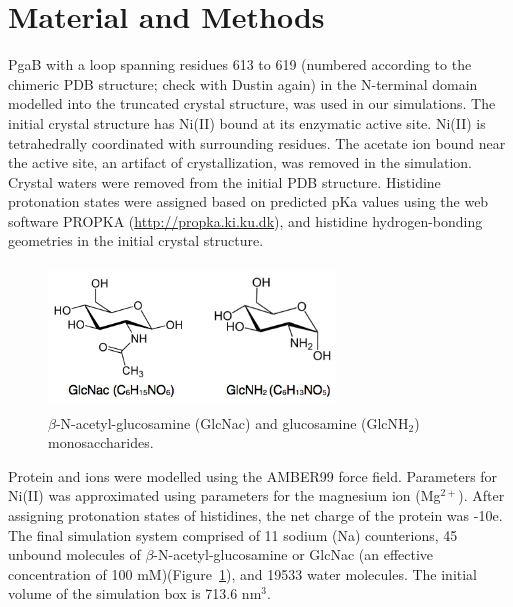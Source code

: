 
\section{Material and Methods}
PgaB with a loop spanning residues 613 to 619 (numbered according to the chimeric PDB structure; check with Dustin again) in the N-terminal domain modelled into the truncated crystal structure, was used in our simulations. The initial crystal structure has Ni(II) bound at its enzymatic active site. Ni(II) is tetrahedrally coordinated with surrounding residues.  The acetate ion bound near the active site, an artifact of crystallization, was removed in the simulation. Crystal waters were removed from the initial PDB structure. Histidine protonation states were assigned based on predicted pKa values using the web software PROPKA (\url{http://propka.ki.ku.dk}), and histidine hydrogen-bonding geometries in the initial crystal structure.

\begin{figure}[nag]
  \centering
  \includegraphics[height=1.5in, width=3in]{figures/results4/figure_pgab_sugars.png}
  \caption[NAG]{$\beta$-N-acetyl-glucosamine (GlcNac) and glucosamine (GlcNH$_2$) monosaccharides.}
  \label{fig:nag}
\end{figure}

Protein and ions were modelled using the AMBER99 force field. Parameters for Ni(II) was approximated using parameters for the magnesium ion (Mg$^{2+}$). After assigning protonation states of histidines, the net charge of the protein was -10e. The final simulation system comprised of 11 sodium (Na) counterions, 45 unbound molecules of $\beta$-N-acetyl-glucosamine or GlcNac (an effective concentration of 100 mM)(Figure~\ref{fig:nag}), and 19533 water molecules. The initial volume of the simulation box is 713.6 nm$^{3}$.

